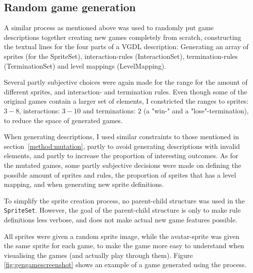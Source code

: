 \documentclass[a4paper,titlepage,final]{report}
\begin{document}
\subsection{Random game generation}
\label{ssec_task1rndGen}
A similar process as mentioned above was used to randomly put game descriptions together creating new games completely from scratch, constructing the textual lines for the four parts of a VGDL description: Generating an array of sprites (for the SpriteSet), interaction-rules (InteractionSet), termination-rules (TerminationSet) and level mappings (LevelMapping). 

Several partly subjective choices were again made for the range for the amount of different sprites, and interaction- and termination rules. 
Even though some of the original games contain a larger set of elements, I constricted the ranges to sprites: ${3-8}$, interactions: ${3-10}$ and terminations: ${2}$ (a "win-" and a "lose"-termination), to reduce the space of generated games.

When generating descriptions, I used similar constraints to those mentioned in section~\ref{method:mutation}, partly to avoid generating descriptions with invalid elements, and partly to increase the proportion of interesting outcomes. 
As for the mutated games, some partly subjective decisions were made on defining the possible amount of sprites and rules, the proportion of sprites that has a level mapping, and when generating new sprite definitions.

To simplify the sprite creation process, no parent-child structure was used in the \texttt{SpriteSet}.
However, the goal of the parent-child structure is only to make rule definitions less verbose, and does not make actual new game features possible.

All sprites were given a random sprite image, while the avatar-sprite was given the same sprite for each game, to make the game more easy to understand when visualising the games (and actually play through them).
Figure \ref{fig:gengamescreenshot} shows an example of a game generated using the process.
\end{document}
